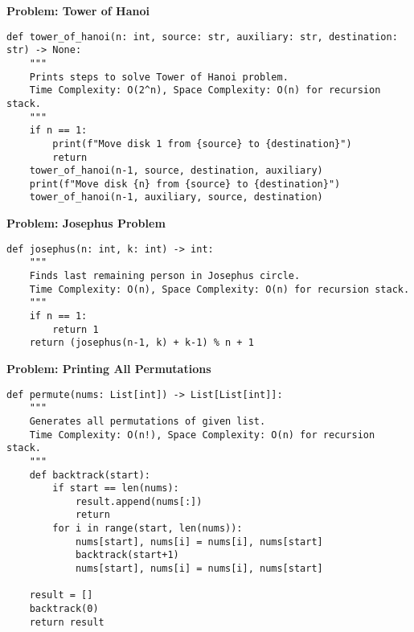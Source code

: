 \noindent\textbf{Problem: Tower of Hanoi}
\begin{verbatim}
def tower_of_hanoi(n: int, source: str, auxiliary: str, destination: str) -> None:
    """
    Prints steps to solve Tower of Hanoi problem.
    Time Complexity: O(2^n), Space Complexity: O(n) for recursion stack.
    """
    if n == 1:
        print(f"Move disk 1 from {source} to {destination}")
        return
    tower_of_hanoi(n-1, source, destination, auxiliary)
    print(f"Move disk {n} from {source} to {destination}")
    tower_of_hanoi(n-1, auxiliary, source, destination)
\end{verbatim}

\noindent\textbf{Problem: Josephus Problem}
\begin{verbatim}
def josephus(n: int, k: int) -> int:
    """
    Finds last remaining person in Josephus circle.
    Time Complexity: O(n), Space Complexity: O(n) for recursion stack.
    """
    if n == 1:
        return 1
    return (josephus(n-1, k) + k-1) % n + 1
\end{verbatim}

\noindent\textbf{Problem: Printing All Permutations}
\begin{verbatim}
def permute(nums: List[int]) -> List[List[int]]:
    """
    Generates all permutations of given list.
    Time Complexity: O(n!), Space Complexity: O(n) for recursion stack.
    """
    def backtrack(start):
        if start == len(nums):
            result.append(nums[:])
            return
        for i in range(start, len(nums)):
            nums[start], nums[i] = nums[i], nums[start]
            backtrack(start+1)
            nums[start], nums[i] = nums[i], nums[start]
            
    result = []
    backtrack(0)
    return result
\end{verbatim}
% 
